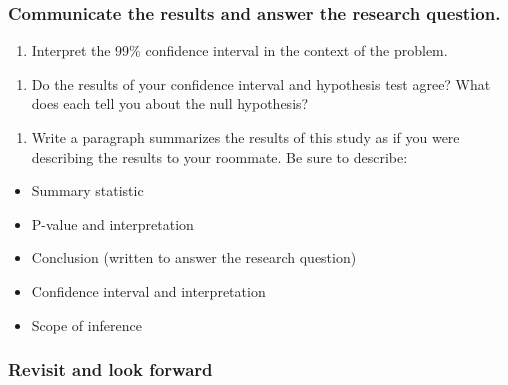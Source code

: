 \documentclass[
]{report}
\providecommand{\tightlist}{%
  \setlength{\itemsep}{0pt}\setlength{\parskip}{0pt}}
\begin{document}
\vspace{.3in}

\hypertarget{communicate-the-results-and-answer-the-research-question.}{%
\subsubsection*{Communicate the results and answer the research question.}\label{communicate-the-results-and-answer-the-research-question.}}

\begin{enumerate}
\def\labelenumi{\arabic{enumi}.}
\setcounter{enumi}{20}
\tightlist
\item
  Interpret the 99\% confidence interval in the context of the problem.
\end{enumerate}

\vspace{.8in}

\begin{enumerate}
\def\labelenumi{\arabic{enumi}.}
\setcounter{enumi}{21}
\tightlist
\item
  Do the results of your confidence interval and hypothesis test agree? What does each tell you about the null hypothesis?
\end{enumerate}

\vspace{.7in}

\begin{enumerate}
\def\labelenumi{\arabic{enumi}.}
\setcounter{enumi}{22}
\tightlist
\item
  Write a paragraph summarizes the results of this study as if you were describing the results to your roommate. Be sure to describe:
\end{enumerate}

\begin{itemize}
\item
  Summary statistic
\item
  P-value and interpretation
\item
  Conclusion (written to answer the research question)
\item
  Confidence interval and interpretation
\item
  Scope of inference
\end{itemize}

\vspace{3in}

\hypertarget{revisit-and-look-forward-2}{%
\subsubsection*{Revisit and look forward}\label{revisit-and-look-forward-2}}
\end{document}

